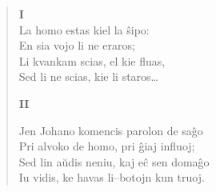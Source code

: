 \begin{verse}
 \vspace*{0.5cm}
 \hspace{2.8cm}
 \textbf{I}\\
 \vspace*{0.5cm}
                 \vin La homo estas kiel la \^sipo:\\
               En sia vojo li ne eraros;\\
               Li kvankam scias, el kie fluas,\\
               Sed li ne scias, kie li staros\dots

 \vspace*{0.5cm}
 \hspace{2.8cm}
 \textbf{II}\\
 \vspace*{0.5cm}

               \vin   Jen Johano komencis parolon de sa\^go\\
               Pri alvoko de homo, pri \^giaj influoj;\\
               Sed lin a\u udis neniu, kaj e\^c sen doma\^go\\
               Iu vidis, ke havas li--botojn kun truoj.

\end{verse}

\smallrule{}
